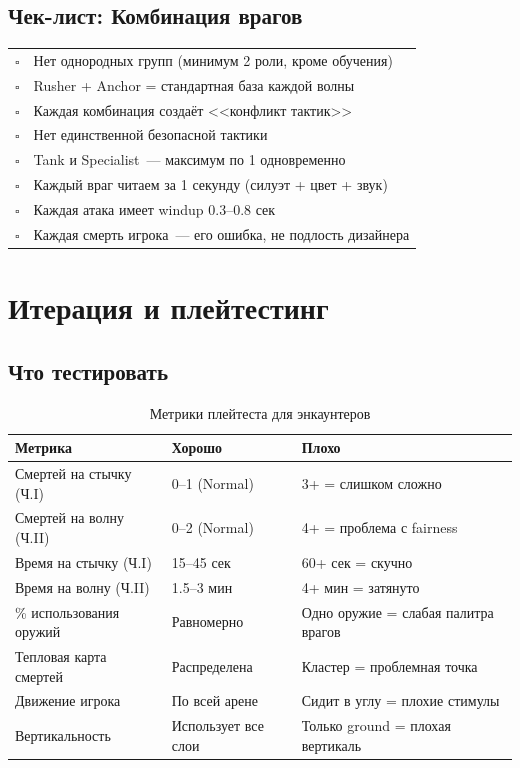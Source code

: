 \documentclass[a4paper,11pt]{report}
\begin{document}
\section{Чек-лист: Комбинация врагов}

\begin{table}[H]
\centering
\begin{tabularx}{\textwidth}{@{}cX@{}}
\toprule
$\square$ & Нет однородных групп (минимум 2 роли, кроме обучения) \\
$\square$ & Rusher + Anchor = стандартная база каждой волны \\
$\square$ & Каждая комбинация создаёт <<конфликт тактик>> \\
$\square$ & Нет единственной безопасной тактики \\
$\square$ & Tank и Specialist~--- максимум по 1 одновременно \\
$\square$ & Каждый враг читаем за 1 секунду (силуэт + цвет + звук) \\
$\square$ & Каждая атака имеет windup 0.3--0.8 сек \\
$\square$ & Каждая смерть игрока~--- его ошибка, не подлость дизайнера \\
\bottomrule
\end{tabularx}
\end{table}


\chapter{Итерация и плейтестинг}

\section{Что тестировать}

\begin{table}[H]
\centering
\caption{Метрики плейтеста для энкаунтеров}
\begin{tabularx}{\textwidth}{@{}lXX@{}}
\toprule
\textbf{Метрика} & \textbf{Хорошо} & \textbf{Плохо} \\
\midrule
Смертей на стычку (Ч.I) & 0--1 (Normal) & 3+ = слишком сложно \\
Смертей на волну (Ч.II) & 0--2 (Normal) & 4+ = проблема с fairness \\
Время на стычку (Ч.I) & 15--45 сек & 60+ сек = скучно \\
Время на волну (Ч.II) & 1.5--3 мин & 4+ мин = затянуто \\
\% использования оружий & Равномерно & Одно оружие = слабая палитра врагов \\
Тепловая карта смертей & Распределена & Кластер = проблемная точка \\
Движение игрока & По всей арене & Сидит в углу = плохие стимулы \\
Вертикальность & Использует все слои & Только ground = плохая вертикаль \\
\bottomrule
\end{tabularx}
\end{table}
\end{document}
